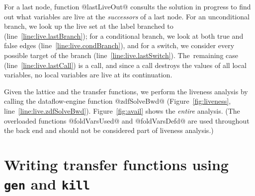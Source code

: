 \documentclass[blockstyle,preprint,natbib,nocopyrightspace]{sigplanconf}
\newcommand\lineref[1]{line~\ref{line:#1}}
\newcommand{\authornote}[1]{{\em #1}}
\def\authornote#1{\unskip\relax}
\newcommand{\norman}[1]{\authornote{NR: #1}}
\let\remark\norman
\newcommand\seclabel[1]{\label{sec:#1}}
\newcommand\figref[1]{Figure~\ref{fig:#1}}
\begin{document}
For a last node, function @lastLiveOut@ consults the solution in
progress to find out what variables are live at the \emph{successors} of a
last node. 
For an unconditional branch, we look up the live set at the label
branched to (\lineref{live.lastBranch});
for a conditional branch, we look at both true and false edges
(\lineref{live.condBranch}), 
 and
for a switch, we consider every possible target of the
branch (\lineref{live.lastSwitch}).
The~remaining case (\lineref{live.lastCall}) is a call, 
and since a call destroys the values of all local variables, no
local variables are live at its continuation.

Given the lattice and the transfer functions,
we perform the liveness analysis by calling
the dataflow-engine function @zdfSolveBwd@ (\figref{liveness},
\lineref{live.zdfSolveBwd}). 
\figref{avail} shows the \emph{entire} analysis.
(The overloaded functions
@foldVarsUsed@ and @foldVarsDefd@
are used throughout the back end and
should not be considered part of liveness analysis.)
%



\ifgenkill
\section{Writing transfer functions using {\mdseries\texttt{gen}} and
{\mdseries\texttt{kill}}}



\seclabel{gen-kill}
\end{document}

